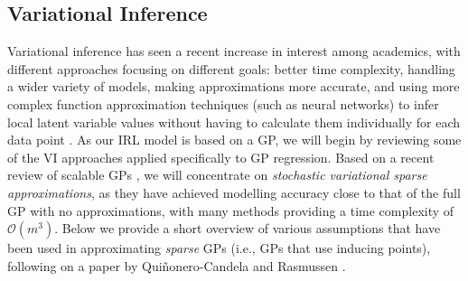\documentclass{mprop}
\theoremstyle{definition}
\begin{document}
\subsection{Variational Inference} \label{sec:vi_literature}

Variational inference has seen a recent increase in interest among academics,
with different approaches focusing on different goals: better time complexity,
handling a wider variety of models, making approximations more accurate, and
using more complex function approximation techniques (such as neural networks)
to infer local latent variable values without having to calculate them
individually for each data point \cite{DBLP:journals/corr/abs-1711-05597}. As
our IRL model is based on a GP, we will begin by reviewing some of the VI
approaches applied specifically to GP regression. Based on a recent review of
scalable GPs \cite{DBLP:journals/corr/abs-1711-05597}, we will concentrate on
\emph{stochastic variational sparse approximations}, as they have achieved
modelling accuracy close to that of the full GP with no approximations, with
many methods providing a time complexity of $\mathcal{O}(m^3)$. Below we provide
a short overview of various assumptions that have been used in approximating
\emph{sparse} GPs (i.e., GPs that use inducing points), following on a paper by
Qui\~{n}onero-Candela and Rasmussen \cite{DBLP:journals/jmlr/CandelaR05}.
\end{document}
